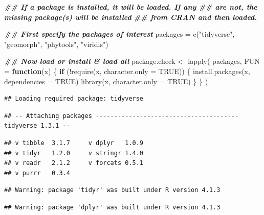 \documentclass[
]{book}
\newenvironment{Shaded}{\begin{snugshade}}{\end{snugshade}}
\newcommand{\AttributeTok}[1]{\textcolor[rgb]{0.77,0.63,0.00}{#1}}
\newcommand{\ConstantTok}[1]{\textcolor[rgb]{0.00,0.00,0.00}{#1}}
\newcommand{\ControlFlowTok}[1]{\textcolor[rgb]{0.13,0.29,0.53}{\textbf{#1}}}
\newcommand{\DocumentationTok}[1]{\textcolor[rgb]{0.56,0.35,0.01}{\textbf{\textit{#1}}}}
\newcommand{\FunctionTok}[1]{\textcolor[rgb]{0.00,0.00,0.00}{#1}}
\newcommand{\NormalTok}[1]{#1}
\newcommand{\OtherTok}[1]{\textcolor[rgb]{0.56,0.35,0.01}{#1}}
\newcommand{\SpecialCharTok}[1]{\textcolor[rgb]{0.00,0.00,0.00}{#1}}
\newcommand{\StringTok}[1]{\textcolor[rgb]{0.31,0.60,0.02}{#1}}
\theoremstyle{definition}
\theoremstyle{definition}
\theoremstyle{definition}
\theoremstyle{definition}
\theoremstyle{remark}
\begin{document}
\begin{Shaded}
\begin{Highlighting}[]
\DocumentationTok{\#\# If a package is installed, it will be loaded. If any }
\DocumentationTok{\#\# are not, the missing package(s) will be installed }
\DocumentationTok{\#\# from CRAN and then loaded.}

\DocumentationTok{\#\# First specify the packages of interest}
\NormalTok{packages }\OtherTok{=} \FunctionTok{c}\NormalTok{(}\StringTok{"tidyverse"}\NormalTok{, }\StringTok{"geomorph"}\NormalTok{,}
             \StringTok{"phytools"}\NormalTok{, }\StringTok{"viridis"}\NormalTok{)}

\DocumentationTok{\#\# Now load or install \& load all}
\NormalTok{package.check }\OtherTok{\textless{}{-}} \FunctionTok{lapply}\NormalTok{(}
\NormalTok{  packages,}
  \AttributeTok{FUN =} \ControlFlowTok{function}\NormalTok{(x) \{}
    \ControlFlowTok{if}\NormalTok{ (}\SpecialCharTok{!}\FunctionTok{require}\NormalTok{(x, }\AttributeTok{character.only =} \ConstantTok{TRUE}\NormalTok{)) \{}
      \FunctionTok{install.packages}\NormalTok{(x, }\AttributeTok{dependencies =} \ConstantTok{TRUE}\NormalTok{)}
      \FunctionTok{library}\NormalTok{(x, }\AttributeTok{character.only =} \ConstantTok{TRUE}\NormalTok{)}
\NormalTok{    \}}
\NormalTok{  \}}
\NormalTok{)}
\end{Highlighting}
\end{Shaded}

\begin{verbatim}
## Loading required package: tidyverse
\end{verbatim}

\begin{verbatim}
## -- Attaching packages --------------------------------------- tidyverse 1.3.1 --
\end{verbatim}

\begin{verbatim}
## v tibble  3.1.7     v dplyr   1.0.9
## v tidyr   1.2.0     v stringr 1.4.0
## v readr   2.1.2     v forcats 0.5.1
## v purrr   0.3.4
\end{verbatim}

\begin{verbatim}
## Warning: package 'tidyr' was built under R version 4.1.3
\end{verbatim}

\begin{verbatim}
## Warning: package 'dplyr' was built under R version 4.1.3
\end{verbatim}
\end{document}
